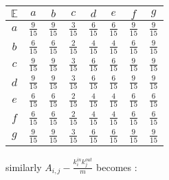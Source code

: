 \documentclass[a4paper, 12pt, twocolumn]{article}
\begin{document}
\begin{center}
       \begin{tabular}{c|ccccccc} 
              $ \mathbb{E} $ & $ a $ & $ b $ & $ c $ & $ d $ & $ e $ & $ f $ & $ g $ \\
              \hline
              $ a $ & $ \frac{9}{15} $ & $ \frac{9}{15} $ & $ \frac{3}{15} $ & $ \frac{6}{15} $ & $ \frac{6}{15} $ & $ \frac{9}{15} $ & $ \frac{9}{15} $ \\
              $ b $ & $ \frac{6}{15} $ & $ \frac{6}{15} $ & $ \frac{2}{15} $ & $ \frac{4}{15} $ & $ \frac{4}{15} $ & $ \frac{6}{15} $ & $ \frac{9}{15} $ \\
              $ c $ & $ \frac{9}{15} $ & $ \frac{9}{15} $ & $ \frac{3}{15} $ & $ \frac{6}{15} $ & $ \frac{6}{15} $ & $ \frac{9}{15} $ & $ \frac{9}{15} $ \\
              $ d $ & $ \frac{9}{15} $ & $ \frac{9}{15} $ & $ \frac{3}{15} $ & $ \frac{6}{15} $ & $ \frac{6}{15} $ & $ \frac{9}{15} $ & $ \frac{9}{15} $ \\
              $ e $ & $ \frac{6}{15} $ & $ \frac{6}{15} $ & $ \frac{2}{15} $ & $ \frac{4}{15} $ & $ \frac{4}{15} $ & $ \frac{6}{15} $ & $ \frac{6}{15} $ \\
              $ f $ & $ \frac{6}{15} $ & $ \frac{6}{15} $ & $ \frac{2}{15} $ & $ \frac{4}{15} $ & $ \frac{4}{15} $ & $ \frac{6}{15} $ & $ \frac{6}{15} $ \\
              $ g $ & $ \frac{9}{15} $ & $ \frac{9}{15} $ & $ \frac{3}{15} $ & $ \frac{6}{15} $ & $ \frac{6}{15} $ & $ \frac{9}{15} $ & $ \frac{9}{15} $ \\
       \end{tabular}
\end{center}

similarly $ A_{i, j} - \frac{k_{i}^{in}k_{j}^{out}}{m} $ becomes :
\end{document}
